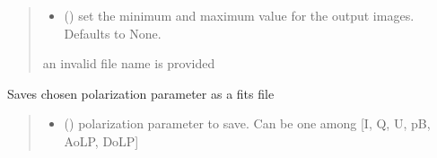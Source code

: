 \documentclass[letterpaper,10pt,english]{sphinxmanual}
\begin{document}
\begin{fulllineitems}
\begin{fulllineitems}
\begin{quote}
\begin{description}
\begin{itemize}
\item {} 
\sphinxAtStartPar
{} (\sphinxstyleliteralemphasis{\sphinxupquote{{[}}}\sphinxstyleliteralemphasis{\sphinxupquote{, }}\sphinxstyleliteralemphasis{\sphinxupquote{{]}}}\sphinxstyleliteralemphasis{\sphinxupquote{, }}) \textendash{} set the minimum and maximum value for the output images. Defaults to None.

\end{itemize}

\sphinxAtStartPar
{} \textendash{} an invalid file name is provided

\end{description}\end{quote}

\end{fulllineitems}


\begin{fulllineitems}
\label{\detokenize{micropolarray:micropolarray.micropol_image.MicropolImage.save_param_as_fits}}
\pysigstartsignatures
{}
\pysigstopsignatures
\sphinxAtStartPar
Saves chosen polarization parameter as a fits file
\begin{quote}\begin{description}
\begin{itemize}
\item {} 
\sphinxAtStartPar
{} () \textendash{} polarization parameter to save. Can be one among {[}I, Q, U, pB, AoLP, DoLP{]}


\end{itemize}
\end{description}
\end{quote}
\end{fulllineitems}
\end{fulllineitems}
\end{document}
